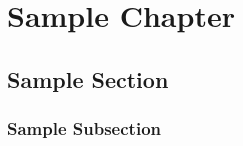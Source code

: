 \setcounter{chapter}{-1}
\chapter{Sample Chapter}
\section{Sample Section}
    \blindtext
\subsection{Sample Subsection}
    \blindtext